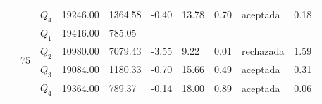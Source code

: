 \begin{table}[]
\begin{tabular}{|l|l|l|l|l|l|l|l|l|l|}
 &  & $Q_4$ & 19246.00 & 1364.58 & -0.40 & 13.78 & 0.70 & aceptada & 0.18 \\ \cline{2-10} 
 & \multirow{4}{*}{75} & $Q_1$ & 19416.00 & 785.05 & \multicolumn{5}{l|}{} \\ \cline{3-10} 
 &  & $Q_2$ & 10980.00 & 7079.43 & -3.55 & 9.22 & 0.01 & rechazada & 1.59 \\ \cline{3-10} 
 &  & $Q_3$ & 19084.00 & 1180.33 & -0.70 & 15.66 & 0.49 & aceptada & 0.31 \\ \cline{3-10} 
 &  & $Q_4$ & 19364.00 & 789.37 & -0.14 & 18.00 & 0.89 & aceptada & 0.06 \\ \hline
\end{tabular}
\end{table}

\clearpage
